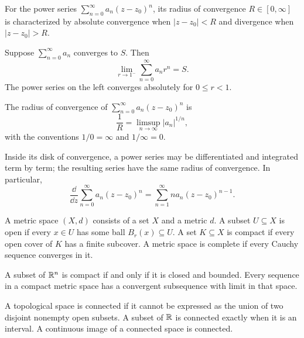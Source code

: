 \begin{definition}
For the power series $\sum_{n=0}^\infty a_n(z-z_0)^n$, its radius of convergence $R\in[0,\infty]$ is characterized by absolute convergence when $|z-z_0|<R$ and divergence when $|z-z_0|>R$.
\end{definition}

\begin{theorem}
Suppose $\sum_{n=0}^\infty a_n$ converges to $S$. Then
\[
 \lim_{r\to1^-}\sum_{n=0}^\infty a_n r^n=S.
\]
The power series on the left converges absolutely for $0\le r<1$.
\end{theorem}

\begin{theorem}
The radius of convergence of $\sum_{n=0}^\infty a_n(z-z_0)^n$ is
\[
 \frac1R=\limsup_{n\to\infty}|a_n|^{1/n},
\]
with the conventions $1/0=\infty$ and $1/\infty=0$.
\end{theorem}

\begin{theorem}
Inside its disk of convergence, a power series may be differentiated and integrated term by term; the resulting series have the same radius of convergence. In particular,
\[
 \frac{\dd}{\dd z}\sum_{n=0}^\infty a_n(z-z_0)^n
 =\sum_{n=1}^\infty na_n(z-z_0)^{n-1}.
\]
\end{theorem}

\begin{definition}
A metric space $(X,d)$ consists of a set $X$ and a metric $d$. A subset $U\subseteq X$ is open if every $x\in U$ has some ball $B_r(x)\subseteq U$. A set $K\subseteq X$ is compact if every open cover of $K$ has a finite subcover. A metric space is complete if every Cauchy sequence converges in it.
\end{definition}

\begin{theorem}
A subset of $\mathbb{R}^n$ is compact if and only if it is closed and bounded. Every sequence in a compact metric space has a convergent subsequence with limit in that space.
\end{theorem}

\begin{definition}[Connectedness]
A topological space is connected if it cannot be expressed as the union of two disjoint nonempty open subsets. A subset of $\mathbb{R}$ is connected exactly when it is an interval. A continuous image of a connected space is connected.
\end{definition}

